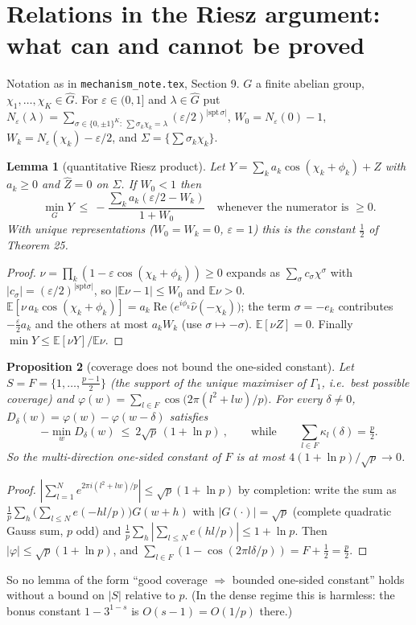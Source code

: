 \documentclass[11pt]{article}
\newtheorem{lemma}{Lemma}\newtheorem{proposition}[lemma]{Proposition}
\renewcommand{\Re}{\operatorname{Re}}
\begin{document}
\section*{Relations in the Riesz argument: what can and cannot be proved}
Notation as in \texttt{mechanism\_note.tex}, Section 9.  $G$ a finite abelian group, $\chi_1,\dots,\chi_K\in\widehat G$.
For $\varepsilon\in(0,1]$ and $\lambda\in\widehat G$ put
$N_\varepsilon(\lambda)=\sum_{\sigma\in\{0,\pm1\}^K:\ \sum\sigma_k\chi_k=\lambda}(\varepsilon/2)^{|\mathrm{spt}\,\sigma|}$,
$W_0=N_\varepsilon(0)-1$, $W_k=N_\varepsilon(\chi_k)-\varepsilon/2$, and $\Sigma=\{\sum\sigma_k\chi_k\}$.

\begin{lemma}[quantitative Riesz product]\label{qr}
Let $Y=\sum_ka_k\cos(\chi_k+\phi_k)+Z$ with $a_k\ge0$ and $\widehat Z=0$ on $\Sigma$.  If $W_0<1$ then
\[\min_GY\ \le\ -\frac{\sum_ka_k(\varepsilon/2-W_k)}{1+W_0}\quad\text{whenever the numerator is }\ge0 .\]
With unique representations ($W_0=W_k=0$, $\varepsilon=1$) this is the constant $\tfrac12$ of Theorem 25.
\end{lemma}
\begin{proof}
$\nu=\prod_k(1-\varepsilon\cos(\chi_k+\phi_k))\ge0$ expands as $\sum_\sigma c_\sigma\chi^\sigma$ with $|c_\sigma|=(\varepsilon/2)^{|\mathrm{spt}\sigma|}$, so
$|\mathbb E\nu-1|\le W_0$ and $\mathbb E\nu>0$.  $\mathbb E[\nu\,a_k\cos(\chi_k+\phi_k)]=a_k\Re\big(e^{i\phi_k}\hat\nu(-\chi_k)\big)$; the term
$\sigma=-e_k$ contributes $-\frac\varepsilon2a_k$ and the others at most $a_kW_k$ (use $\sigma\mapsto-\sigma$).  $\mathbb E[\nu Z]=0$.
Finally $\min Y\le\mathbb E[\nu Y]/\mathbb E\nu$.
\end{proof}

\begin{proposition}[coverage does not bound the one-sided constant]\label{cov}
Let $S=F=\{1,\dots,\frac{p-1}2\}$ (the support of the unique maximiser of $\Gamma_1$, i.e.\ best possible coverage) and
$\varphi(w)=\sum_{l\in F}\cos\big(2\pi(l^2+lw)/p\big)$.  For every $\delta\ne0$, $D_\delta(w)=\varphi(w)-\varphi(w-\delta)$ satisfies
\[-\min_wD_\delta(w)\ \le\ 2\sqrt p\,(1+\ln p)\ ,\qquad\text{while}\qquad \sum_{l\in F}\kappa_l(\delta)=\tfrac p2 .\]
So the multi-direction one-sided constant of $F$ is at most $4(1+\ln p)/\sqrt p\to0$.
\end{proposition}
\begin{proof}
$|\sum_{l=1}^Ne^{2\pi i(l^2+lw)/p}|\le\sqrt p(1+\ln p)$ by completion: write the sum as
$\frac1p\sum_h\big(\sum_{l\le N}e(-hl/p)\big)G(w+h)$ with $|G(\cdot)|=\sqrt p$ (complete quadratic Gauss sum, $p$ odd) and
$\frac1p\sum_h|\sum_{l\le N}e(hl/p)|\le1+\ln p$.  Then $|\varphi|\le\sqrt p(1+\ln p)$, and
$\sum_{l\in F}(1-\cos(2\pi l\delta/p))=F+\frac12=\frac p2$.
\end{proof}
So no lemma of the form ``good coverage $\Rightarrow$ bounded one-sided constant'' holds without a bound on $|S|$ relative
to $p$.  (In the dense regime this is harmless: the bonus constant $1-3^{1-s}$ is $O(s-1)=O(1/p)$ there.)
\end{document}
